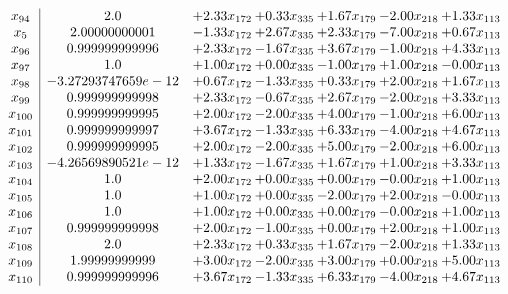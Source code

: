 \documentclass[8pt]{article}
\begin{document}
\[\begin{array}{c| c c@{\hskip 2pt} c@{\hskip 2pt} c@{\hskip 2pt} c@{\hskip 2pt} c@{\hskip 2pt} }
 x_{94}   &  2.0 & +  2.33 x_{172} & +  0.33 x_{335} & +  1.67 x_{179} & -2.00 x_{218} & +  1.33 x_{113}\\
 x_{5}   &  2.00000000001 & -1.33 x_{172} & +  2.67 x_{335} & +  2.33 x_{179} & -7.00 x_{218} & +  0.67 x_{113}\\
 x_{96}   &  0.999999999996 & +  2.33 x_{172} & -1.67 x_{335} & +  3.67 x_{179} & -1.00 x_{218} & +  4.33 x_{113}\\
 x_{97}   &  1.0 & +  1.00 x_{172} & +  0.00 x_{335} & -1.00 x_{179} & +  1.00 x_{218} & -0.00 x_{113}\\
 x_{98}   &  -3.27293747659e-12 & +  0.67 x_{172} & -1.33 x_{335} & +  0.33 x_{179} & +  2.00 x_{218} & +  1.67 x_{113}\\
 x_{99}   &  0.999999999998 & +  2.33 x_{172} & -0.67 x_{335} & +  2.67 x_{179} & -2.00 x_{218} & +  3.33 x_{113}\\
 x_{100}   &  0.999999999995 & +  2.00 x_{172} & -2.00 x_{335} & +  4.00 x_{179} & -1.00 x_{218} & +  6.00 x_{113}\\
 x_{101}   &  0.999999999997 & +  3.67 x_{172} & -1.33 x_{335} & +  6.33 x_{179} & -4.00 x_{218} & +  4.67 x_{113}\\
 x_{102}   &  0.999999999995 & +  2.00 x_{172} & -2.00 x_{335} & +  5.00 x_{179} & -2.00 x_{218} & +  6.00 x_{113}\\
 x_{103}   &  -4.26569890521e-12 & +  1.33 x_{172} & -1.67 x_{335} & +  1.67 x_{179} & +  1.00 x_{218} & +  3.33 x_{113}\\
 x_{104}   &  1.0 & +  2.00 x_{172} & +  0.00 x_{335} & +  0.00 x_{179} & -0.00 x_{218} & +  1.00 x_{113}\\
 x_{105}   &  1.0 & +  1.00 x_{172} & +  0.00 x_{335} & -2.00 x_{179} & +  2.00 x_{218} & -0.00 x_{113}\\
 x_{106}   &  1.0 & +  1.00 x_{172} & +  0.00 x_{335} & +  0.00 x_{179} & -0.00 x_{218} & +  1.00 x_{113}\\
 x_{107}   &  0.999999999998 & +  2.00 x_{172} & -1.00 x_{335} & +  0.00 x_{179} & +  2.00 x_{218} & +  1.00 x_{113}\\
 x_{108}   &  2.0 & +  2.33 x_{172} & +  0.33 x_{335} & +  1.67 x_{179} & -2.00 x_{218} & +  1.33 x_{113}\\
 x_{109}   &  1.99999999999 & +  3.00 x_{172} & -2.00 x_{335} & +  3.00 x_{179} & +  0.00 x_{218} & +  5.00 x_{113}\\
 x_{110}   &  0.999999999996 & +  3.67 x_{172} & -1.33 x_{335} & +  6.33 x_{179} & -4.00 x_{218} & +  4.67 x_{113}\\

\end{array}\]
\end{document}

